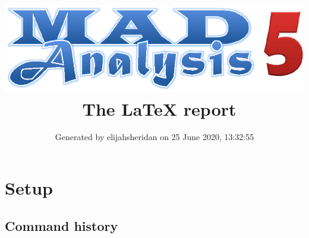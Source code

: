 \documentclass[a4paper, 10pt]{article}
\title{{\includegraphics[scale=.4]{logo.eps}}\ The LaTeX report}
\author{Generated by elijahsheridan on 25 June 2020, 13:32:55}
\begin{document}
\maketitle
\flushbottom

\newpage
\section{ Setup}

\subsection{ Command history}
\end{document}

